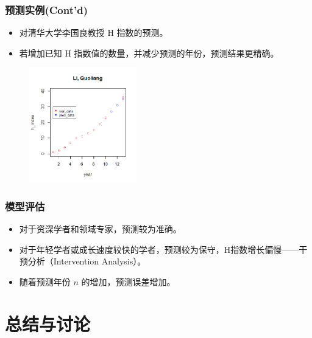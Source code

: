 \documentclass[11pt,compress,t, xcolor=table]{beamer}
\begin{document}
\begin{frame}
	\frametitle{预测实例(Cont'd)}
	\begin{itemize}	
		\item 对清华大学李国良教授 H 指数的预测。
		\item 若增加已知 H 指数值的数量，并减少预测的年份，预测结果更精确。
	\end{itemize}
	
	\begin{figure}[H]
		\footnotesize
		\centering
		\includegraphics[height=5cm]{image/lgl2.png}
	\end{figure}
	
\end{frame}

\begin{frame}
	\frametitle{模型评估}
	\begin{itemize}	
		\item 对于资深学者和领域专家，预测较为准确。
		\smallskip	
		\item 对于年轻学者或成长速度较快的学者，预测较为保守，H指数增长偏慢——干预分析（Intervention Analysis）。
		\smallskip
		\item 随着预测年份 $n$ 的增加，预测误差增加。
		\smallskip
	\end{itemize}
	
\end{frame}




\section[总结与讨论]{总结与讨论}
\end{document}

